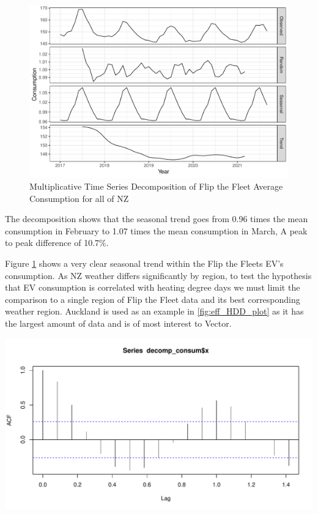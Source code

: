 \documentclass[
]{article}
\begin{document}
\begin{figure}
\centering
\includegraphics{summary_week4_files/figure-latex/consum_decomp_plot-1.pdf}
\caption{Multiplicative Time Series Decomposition of Flip the Fleet
Average Consumption for all of NZ\label{fig:consum_decomp_plot}}
\end{figure}

The decomposition shows that the seasonal trend goes from 0.96 times the
mean consumption in February to 1.07 times the mean consumption in
March, A peak to peak difference of 10.7\%.

Figure \ref{fig:consum_decomp_plot} shows a very clear seasonal trend
within the Flip the Fleets EV's consumption. As NZ weather differs
significantly by region, to test the hypothesis that EV consumption is
correlated with heating degree days we must limit the comparison to a
single region of Flip the Fleet data and its best corresponding weather
region. Auckland is used as an example in \ref{fig:eff_HDD_plot} as it
has the largest amount of data and is of most interest to Vector.

\includegraphics{summary_week4_files/figure-latex/unnamed-chunk-1-1.pdf}
\end{document}
